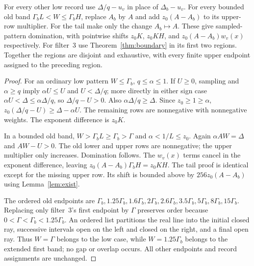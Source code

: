\begin{lemma}\label{lem:ordinary}
For every other low record use $\Delta/q-u_v$ in place of
$\Delta_b-u_v$. For every bounded old band
$\Gamma_bL<W\le\Gamma_bH$, replace $A_b$ by $A$ and add
$z_0(A-A_b)$ to its upper-row multiplier. For the tail make only the
change $A_b\mapsto A$. These give sampled-pattern domination, with
pointwise shifts $z_0K$, $z_0KH$, and $z_0(A-A_b)w_v(x)$ respectively.
For filter~3 use Theorem~\ref{thm:boundary} in its first two regions.
Together the regions are disjoint and exhaustive, with every finite
upper endpoint assigned to the preceding region.
\end{lemma}
\begin{proof}
For an ordinary low pattern $W\le\Gamma_b$, $q\le\alpha\le1$.
If $U\ge0$, sampling and $\alpha\ge q$ imply
$\alpha U\le U$ and $U<\Delta/q$; more directly in either sign case
$\alpha U<\Delta\le\alpha\Delta/q$, so $\Delta/q-U>0$.
Also $\alpha\Delta/q\ge\Delta$. Since $z_0\ge1\ge\alpha$,
$z_0(\Delta/q-U)\ge\Delta-\alpha U$. The remaining rows are
nonnegative with nonnegative weights. The exponent difference is $z_0K$.

In a bounded old band, $W>\Gamma_bL\ge\Gamma_b>\Gamma$ and
$\alpha<1/L\le z_0$. Again $\alpha AW=\Delta$ and $AW-U>0$.
The old lower and upper rows are nonnegative; the upper multiplier
only increases. Domination follows. The $w_v(x)$ terms cancel in the
exponent difference, leaving $z_0(A-A_b)\Gamma_bH=z_0KH$.
The tail proof is identical except for the missing upper row. Its
shift is bounded above by $256z_0(A-A_b)$ using Lemma~\ref{lem:exist}.

The ordered old endpoints are
$\Gamma_b,1.25\Gamma_b,1.6\Gamma_b,2\Gamma_b,2.6\Gamma_b,
3.5\Gamma_b,5\Gamma_b,8\Gamma_b,15\Gamma_b$.
Replacing only filter~3's first endpoint by $\Gamma$ preserves order
because $0<\Gamma<\Gamma_b<1.25\Gamma_b$.
An ordered list partitions the real line into the initial closed ray,
successive intervals open on the left and closed on the right, and a
final open ray. Thus $W=\Gamma$ belongs to the low case, while
$W=1.25\Gamma_b$ belongs to the extended first band; no gap or
overlap occurs. All other endpoints and record assignments are unchanged.
\end{proof}

